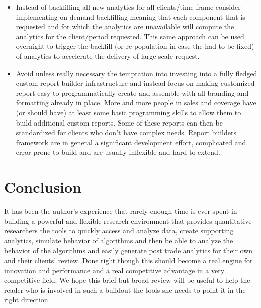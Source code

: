 \begin{itemize}
\item Instead of backfilling all new analytics for all clients/time-frame consider implementing on demand backfilling meaning that each component that is requested and for which the analytics are unavailable will compute the analytics for the client/period requested. This same approach can be used overnight to trigger the backfill  (or re-population in case the had to be fixed) of analytics to accelerate the delivery of large scale request.

\item Avoid unless really necessary the temptation into investing into a fully fledged custom report builder infrastructure and instead focus on making customized report easy to programmatically create and assemble with all branding and formatting already in place. More and more people in sales and coverage have (or should have) at least some basic programming skills to allow them to build additional custom reports. Some of these reports can then be standardized for clients who don't have complex needs. Report builders framework are in general a significant development effort, complicated and error prone to build and are usually inflexible and hard to extend. 
\end{itemize}
 

\section{Conclusion}
It has been the author's experience that rarely enough time is ever spent in building a powerful and flexible research environment that provides quantitative researchers the tools to quickly access and analyze data, create supporting analytics, simulate behavior of algorithms and then be able to analyze the behavior of the algorithms and easily generate post trade analytics for their own and their clients' review. Done right though this should become a real engine for innovation and performance and a real competitive advantage in a very competitive field. We hope this brief but broad review will be useful to help the reader who is involved in such a buildout the tools she needs to point it in the right direction.
